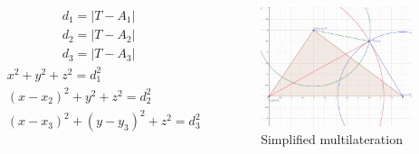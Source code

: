 \documentclass[10pt]{beamer}
\begin{document}
\begin{frame}
\begin{columns}
        \begin{equation}
            \begin{split}
                d_1 = | T - A_1| \\
                d_2 = | T - A_2| \\
                d_3 = | T - A_3|
            \end{split}
        \end{equation}
        \begin{subequations}
            \begin{align}
                & x^2 + y^2 + z^2 = d_1^2 \label{eqn:d1_t_a_a}\\
                & (x-x_2)^2 + y^2 + z^2 = d_2^2 \label{eqn:d1_t_a_b}\\
                & (x-x_3)^2 + (y-y_3)^2 + z^2 = d_3^2 \label{eqn:d1_t_a_c}
            \end{align}
        \end{subequations}
        \begin{figure}[H]
            \centering
            \includegraphics[width=1\textwidth]{simplified_multilateration.png}
            \caption{Simplified multilateration}
            \label{fig:simplified_multilateration}
        \end{figure}
    \end{columns}


\end{frame}
\end{document}
